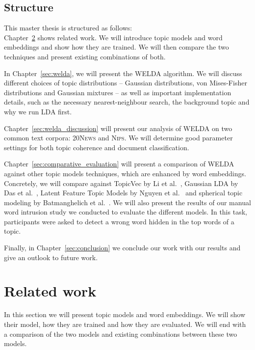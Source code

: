 \documentclass[
        a4paper,
        titlepage,
        twoside,
        parskip
        ]{scrbook}
\theoremstyle{break}
\begin{document}
\section{Structure}
This master thesis is structured as follows: \\
\noindent Chapter~\ref{sec:related_work} shows related work.
We will introduce topic models and word embeddings and show how they are trained.
We will then compare the two techniques and present existing combinations of both.

\noindent In Chapter~\ref{sec:welda}, we will present the WELDA algorithm.
We will discuss different choices of topic distributions -- Gaussian distributions, von Mises-Fisher distributions and Gaussian mixtures -- as well as important implementation details, such as the necessary nearest-neighbour search, the background topic and why we run LDA first.

\noindent Chapter~\ref{sec:welda_discussion} will present our analysis of WELDA on two common text corpora: \textsc{20News} and \textsc{Nips}.
We will determine good parameter settings for both topic coherence and document classification.

\noindent Chapter~\ref{sec:comparative_evaluation} will present a comparison of WELDA against other topic models techniques, which are enhanced by word embeddings.
Concretely, we will compare against TopicVec by Li et al.~\cite{Li2016}, Gaussian LDA by Das et al.~\cite{Das2015}, Latent Feature Topic Models by Nguyen et al.~\cite{Nguyen2015} and spherical topic modeling by Batmanghelich et al.~\cite{Batmanghelich2016}.
We will also present the results of our manual word intrusion study we conducted to evaluate the different models.
In this task, participants were asked to detect a wrong word hidden in the top words of a topic.

\noindent Finally, in Chapter~\ref{sec:conclusion} we conclude our work with our results and give an outlook to future work.

\chapter{Related work}
\label{sec:related_work}
In this section we will present topic models and word embeddings.
We will show their model, how they are trained and how they are evaluated.
We will end with a comparison of the two models and existing combinations between these two models.
\end{document}
